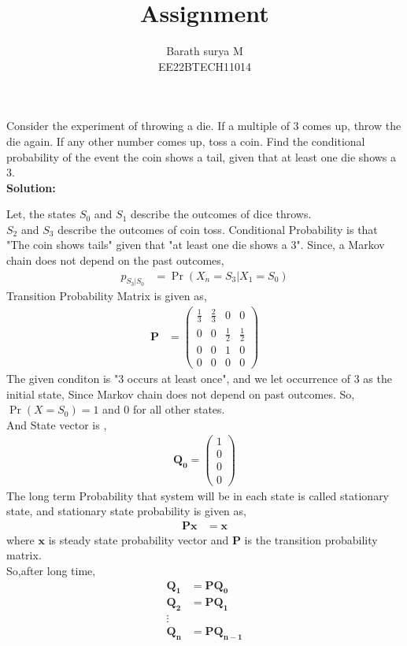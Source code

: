 \documentclass[journal,12pt,two column]{IEEEtran}
\title{Assignment}
\author{Barath surya M \\ EE22BTECH11014}
\providecommand{\pr}[1]{\ensuremath{\Pr\left(#1\right)}}
\newcommand{\solution}{\noindent \textbf{Solution: }}
\newcommand{\myvec}[1]{\ensuremath{\begin{pmatrix}#1\end{pmatrix}}}
\providecommand{\pr}[1]{\ensuremath{\Pr\left(#1\right)}}
\let\vec\mathbf
\begin{document}
\maketitle
Consider the experiment of throwing a die. If a multiple of 3 comes up, throw the die again. If any other number comes up, toss a coin. Find the conditional probability of the event the coin shows a tail, given that  at least one die shows a 3.\\
\solution
\begin{table}[ht!]
	
\end{table}
Let, the states $S_0$ and $S_1$ describe the outcomes of dice throws.\\
$S_2$ and $S_3$ describe the outcomes of coin toss.
Conditional Probability is that "The coin shows tails" given that "at least one die shows a 3".
Since, a Markov chain does not depend on the past outcomes,
\begin{align}
    p_{S_3 | S_0}&=\pr{X_n=S_3|X_1 =S_0}
\end{align}
Transition Probability Matrix is given as,
\begin{align}
    \vec{P}&=\myvec{\frac{1}{3}&\frac{2}{3}&0&0\\
                0&0&\frac{1}{2}&\frac{1}{2}\\
                0&0&1&0\\
                0&0&0&0
                }
\end{align}
The given conditon is "3 occurs at least once", and we let occurrence of 3 as the initial state, Since Markov chain does not depend on past outcomes. So, $\pr{X=S_0}=1$ and 0 for all other states.\\
And State vector is ,
\begin{align}
    \vec{Q_0}=\myvec{1\\0\\0\\0}
\end{align}
The long term Probability that system will be in each state is called stationary state, and stationary state probability is given as,
\begin{align}
            \vec{Px}&=\vec{x}
\end{align}
where $\vec{x}$ is steady state probability vector and $\vec{P}$ is the transition probability matrix.\\So,after long time,
\begin{align}
    \vec{Q_1}&=\vec{P Q_0}\\
    \vec{Q_2}&=\vec{P Q_1}\\
    \vdots\\
    \vec{Q_{n}}&=\vec{P Q_{n-1}}
\end{align}
\end{document}
